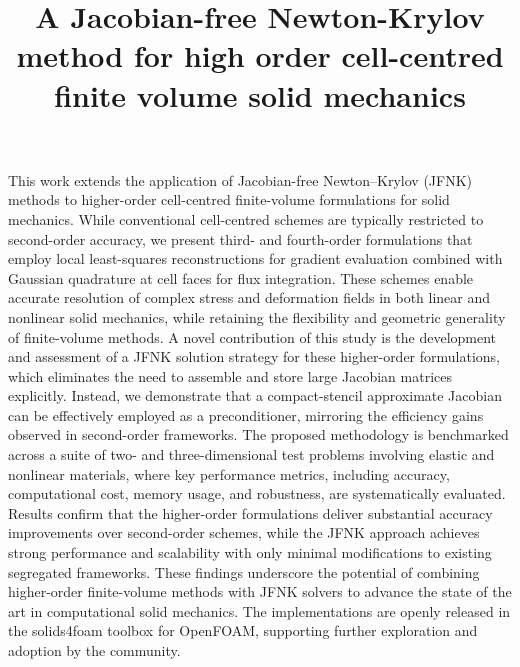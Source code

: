 \documentclass[sn-mathphys,Numbered]{sn-jnl}%
\begin{document}
\title[Article Title]{A Jacobian-free Newton-Krylov method for high order cell-centred finite volume solid mechanics}

\author[1,2]{ }
\author[1,3]{ }
\author*[1]{ }


\abstract
{
This work extends the application of Jacobian-free Newton–Krylov (JFNK) methods to higher-order cell-centred finite-volume formulations for solid mechanics.
While conventional cell-centred schemes are typically restricted to second-order accuracy, we present third- and fourth-order formulations that employ local least-squares reconstructions for gradient evaluation combined with Gaussian quadrature at cell faces for flux integration.
These schemes enable accurate resolution of complex stress and deformation fields in both linear and nonlinear solid mechanics, while retaining the flexibility and geometric generality of finite-volume methods.
A novel contribution of this study is the development and assessment of a JFNK solution strategy for these higher-order formulations, which eliminates the need to assemble and store large Jacobian matrices explicitly.
Instead, we demonstrate that a compact-stencil approximate Jacobian can be effectively employed as a preconditioner, mirroring the efficiency gains observed in second-order frameworks.
The proposed methodology is benchmarked across a suite of two- and three-dimensional test problems involving elastic and nonlinear materials, where key performance metrics, including accuracy, computational cost, memory usage, and robustness, are systematically evaluated.
Results confirm that the higher-order formulations deliver substantial accuracy improvements over second-order schemes, while the JFNK approach achieves strong performance and scalability with only minimal modifications to existing segregated frameworks.
These findings underscore the potential of combining higher-order finite-volume methods with JFNK solvers to advance the state of the art in computational solid mechanics.
The implementations are openly released in the solids4foam toolbox for OpenFOAM, supporting further exploration and adoption by the community.
}
\end{document}
